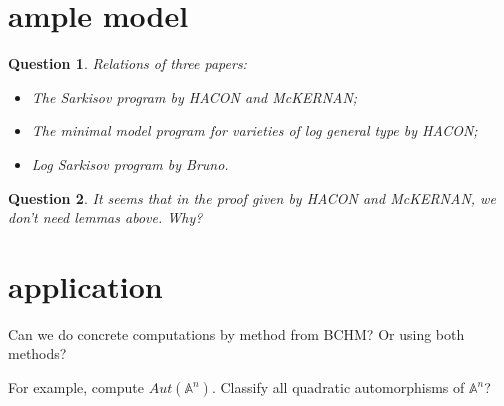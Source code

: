 \documentclass{article}
\newtheorem*{ques}{Question}
\begin{document}
	
\section{ample model}
\begin{ques}
	Relations of three papers:
	\begin{itemize}
		\item \textit{The Sarkisov program} by HACON and McKERNAN; 
		\item \textit{The minimal model program for varieties of log general type} by HACON; 
		\item  \textit{Log Sarkisov program} by Bruno.
	\end{itemize}
\end{ques}


\begin{ques}
	It seems that in the proof given by HACON and McKERNAN, we don't need lemmas above. Why?
\end{ques}
\section{application}
Can we do concrete computations by method from BCHM? Or using both methods?

For example, compute $ Aut(\mathbb{A}^n) $. Classify all quadratic automorphisms of $ \mathbb{A}^n $?
\end{document}
